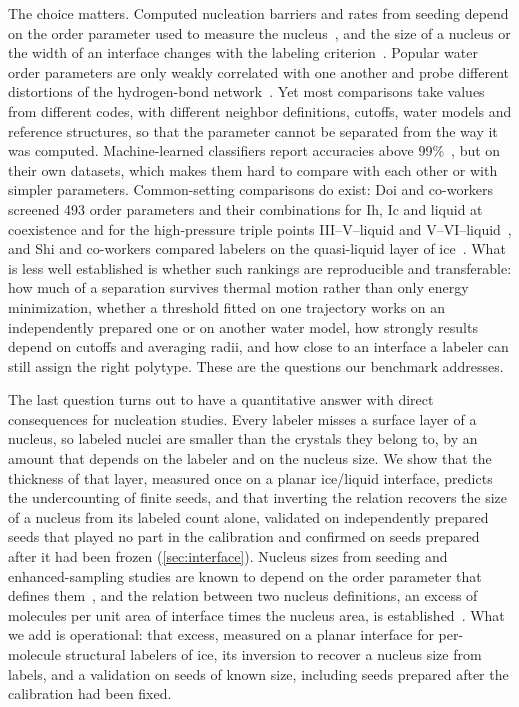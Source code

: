 \documentclass[11pt,a4paper]{article}
\begin{document}
The choice matters. Computed nucleation barriers and rates from seeding depend
on the order parameter used to measure the nucleus~\cite{Espinosa2016,
SanchezBurgos2022,Gispen2024}, and the size of a nucleus or the width of an
interface changes with the labeling
criterion~\cite{Blow2021,Shi2022}. Popular water order parameters are only
weakly correlated with one another and probe different distortions of the
hydrogen-bond network~\cite{DuboueDijon2015,Donkor2023}. Yet most comparisons
take values from different codes, with different neighbor definitions,
cutoffs, water models and reference structures, so that the parameter cannot
be separated from the way it was computed. Machine-learned classifiers report
accuracies above 99\%~\cite{DeFever2019,Kim2020,Moradzadeh2023}, but on their
own datasets, which makes them hard to compare with each other or with simpler
parameters. Common-setting comparisons do exist: Doi and co-workers screened
493 order parameters and their combinations for Ih, Ic and liquid at
coexistence and for the high-pressure triple points III--V--liquid and
V--VI--liquid~\cite{Doi2021,Doi2021b,Doi2021c}, and Shi and co-workers compared
labelers on the quasi-liquid layer of ice~\cite{Shi2022}. What is less well
established is whether such rankings are reproducible and transferable: how
much of a separation survives thermal motion rather than only energy
minimization, whether a threshold fitted on one trajectory works on an
independently prepared one or on another water model, how strongly results
depend on cutoffs and averaging radii, and how close to an interface a labeler
can still assign the right polytype. These are the questions our benchmark
addresses.

The last question turns out to have a quantitative answer with direct
consequences for nucleation studies. Every labeler misses a surface layer of
a nucleus, so labeled nuclei are smaller than the crystals they belong to, by
an amount that depends on the labeler and on the nucleus size. We show that
the thickness of that layer, measured once on a planar ice/liquid interface,
predicts the undercounting of finite seeds, and that inverting the relation
recovers the size of a nucleus from its labeled count alone, validated on
independently prepared seeds that played no part in the calibration and
confirmed on seeds prepared after it had been frozen (\cref{sec:interface}).
Nucleus sizes from seeding and enhanced-sampling studies are known to depend
on the order parameter that defines
them~\cite{Espinosa2016,SanchezBurgos2022,Gispen2024}, and the relation
between two nucleus definitions, an excess of molecules per unit area of
interface times the nucleus area, is established~\cite{Cheng2017}. What we
add is operational: that excess, measured on a planar interface for
per-molecule structural labelers of ice, its inversion to recover a nucleus
size from labels, and a validation on seeds of known size, including seeds
prepared after the calibration had been fixed.
\end{document}

